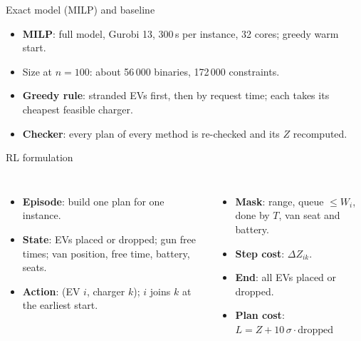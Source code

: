 \documentclass[aspectratio=169,11pt,t]{beamer}
\begin{document}
\begin{frame}{Exact model (MILP) and baseline}
\begin{itemize}
  \item \textbf{MILP}: full model, Gurobi 13, 300\,s per instance, 32 cores; greedy warm start.
  \item Size at $n=100$: about 56\,000 binaries, 172\,000 constraints.
  \item \textbf{Greedy rule}: stranded EVs first, then by request time; each takes its cheapest feasible charger.
  \item \textbf{Checker}: every plan of every method is re-checked and its $Z$ recomputed.
\end{itemize}
\end{frame}

\begin{frame}{RL formulation}
\begin{columns}[T]
\begin{itemize}
  \item \textbf{Episode}: build one plan for one instance.
  \item \textbf{State}: EVs placed or dropped; gun free times; van position, free time, battery, seats.
  \item \textbf{Action}: (EV $i$, charger $k$); $i$ joins $k$ at the earliest start.
\end{itemize}
\begin{itemize}
  \item \textbf{Mask}: range, queue $\le W_i$, done by $T$, van seat and battery.
  \item \textbf{Step cost}: $\Delta Z_{ik}$.
  \item \textbf{End}: all EVs placed or dropped.
  \item \textbf{Plan cost}: $L = Z + 10\,\sigma\cdot\text{dropped}$
\end{itemize}
\end{columns}
\end{frame}
\end{document}

